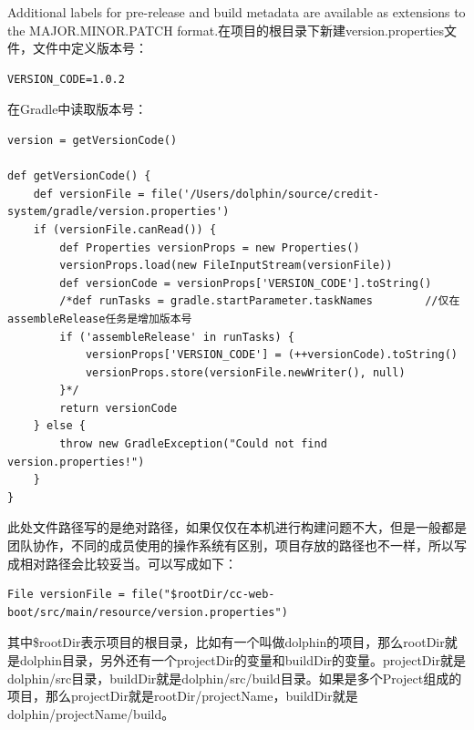\documentclass[letter]{book}
\begin{document}
Additional labels for pre-release and build metadata are available as extensions to the MAJOR.MINOR.PATCH format.在项目的根目录下新建version.properties文件，文件中定义版本号：

\begin{lstlisting}
VERSION_CODE=1.0.2
\end{lstlisting}

在Gradle中读取版本号：

\begin{lstlisting}
version = getVersionCode()

def getVersionCode() {
	def versionFile = file('/Users/dolphin/source/credit-system/gradle/version.properties')
	if (versionFile.canRead()) {
		def Properties versionProps = new Properties()
		versionProps.load(new FileInputStream(versionFile))
		def versionCode = versionProps['VERSION_CODE'].toString()
		/*def runTasks = gradle.startParameter.taskNames        //仅在assembleRelease任务是增加版本号
		if ('assembleRelease' in runTasks) {
			versionProps['VERSION_CODE'] = (++versionCode).toString()
			versionProps.store(versionFile.newWriter(), null)
		}*/
		return versionCode
	} else {
		throw new GradleException("Could not find version.properties!")
	}
}
\end{lstlisting}

此处文件路径写的是绝对路径，如果仅仅在本机进行构建问题不大，但是一般都是团队协作，不同的成员使用的操作系统有区别，项目存放的路径也不一样，所以写成相对路径会比较妥当。可以写成如下：

\begin{lstlisting}
File versionFile = file("$rootDir/cc-web-boot/src/main/resource/version.properties")
\end{lstlisting}

其中\$rootDir表示项目的根目录，比如有一个叫做dolphin的项目，那么rootDir就是dolphin目录，另外还有一个projectDir的变量和buildDir的变量。projectDir就是dolphin/src目录，buildDir就是dolphin/src/build目录。如果是多个Project组成的项目，那么projectDir就是rootDir/projectName，buildDir就是dolphin/projectName/build。
\end{document}
